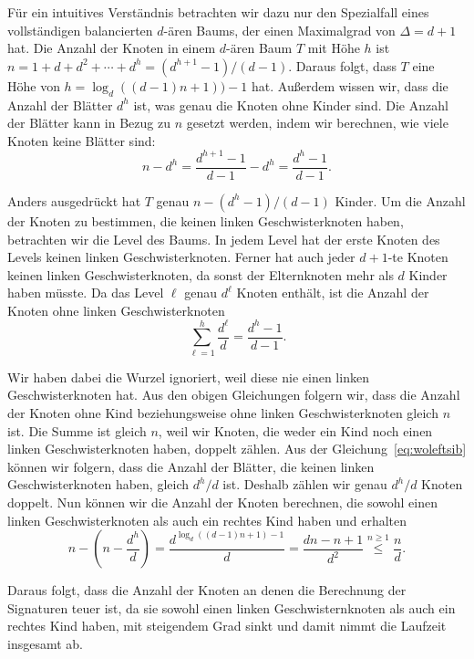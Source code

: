 Für ein intuitives Verständnis betrachten wir dazu nur den Spezialfall eines vollständigen balancierten $d$\hyp ären Baums, der einen Maximalgrad von $\Delta = d + 1$ hat.
Die Anzahl der Knoten in einem $d$\hyp ären Baum $T$ mit Höhe $h$ ist $n = 1 + d + d^2 + \cdots + d^h = (d^{h+1} - 1)/(d - 1)$.
Daraus folgt, dass $T$ eine Höhe von $h = \log_d((d-1)n+1))-1$ hat.
Außerdem wissen wir, dass die Anzahl der Blätter $d^h$ ist, was genau die Knoten ohne Kinder sind.
Die Anzahl der Blätter kann in Bezug zu $n$ gesetzt werden, indem wir berechnen, wie viele Knoten keine Blätter sind:
\begin{equation*}
    n - d^h = \frac{d^{h+1} - 1}{d - 1}  - d^h = \frac{d^h - 1}{d - 1}.
\end{equation*}

Anders ausgedrückt hat $T$ genau $n - (d^h - 1)/(d - 1)$ Kinder.
Um die Anzahl der Knoten zu bestimmen, die keinen linken Geschwisterknoten haben, betrachten wir die Level des Baums.
In jedem Level hat der erste Knoten des Levels keinen linken Geschwisterknoten.
Ferner hat auch jeder $d+1$\hyp te Knoten keinen linken Geschwisterknoten, da sonst der Elternknoten mehr als $d$ Kinder haben müsste.
Da das Level $\ell$ genau $d^{\ell}$ Knoten enthält, ist die Anzahl der Knoten ohne linken Geschwisterknoten
\begin{equation}\label{eq:woleftsib}
    \sum_{\ell=1}^{h} \frac{d^\ell}{d} = \frac{d^h - 1}{d - 1}.
\end{equation}

Wir haben dabei die Wurzel ignoriert, weil diese nie einen linken Geschwisterknoten hat.
Aus den obigen Gleichungen folgern wir, dass die Anzahl der Knoten ohne Kind beziehungsweise ohne linken Geschwisterknoten gleich $n$ ist.
Die Summe ist gleich $n$, weil wir Knoten, die weder ein Kind noch einen linken Geschwisterknoten haben, doppelt zählen.
Aus der Gleichung~\eqref{eq:woleftsib} können wir folgern, dass die Anzahl der Blätter, die keinen linken Geschwisterknoten haben, gleich $d^h / d$ ist.
Deshalb zählen wir genau $d^h / d$ Knoten doppelt.
Nun können wir die Anzahl der Knoten berechnen, die sowohl einen linken Geschwisterknoten als auch ein rechtes Kind haben und erhalten
\begin{equation*}
    n - \left(n - \frac{d^h}{d}\right) = \frac{d^{\log_d((d-1)n + 1) - 1}}{d} = \frac{dn - n + 1}{d^2} \overset{n \geq 1}{\leq} \frac{n}{d}.
\end{equation*}

Daraus folgt, dass die Anzahl der Knoten an denen die Berechnung der Signaturen teuer ist, da sie sowohl einen linken Geschwisternknoten als auch ein rechtes Kind haben, mit steigendem Grad sinkt und damit nimmt die Laufzeit insgesamt ab.


